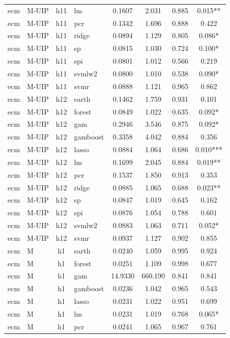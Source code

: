 \begin{ThreePartTable}
\begin{longtable}[t]{llclcccc}
ecm & M-UIP & h11 & lm & 0.1607 & 2.031 & 0.885 & 0.015**\\
ecm & M-UIP & h11 & pcr & 0.1342 & 1.696 & 0.888 & 0.422\\
ecm & M-UIP & h11 & ridge & 0.0894 & 1.129 & 0.805 & 0.086*\\
ecm & M-UIP & h11 & sp & 0.0815 & 1.030 & 0.724 & 0.100*\\
ecm & M-UIP & h11 & spi & 0.0801 & 1.012 & 0.566 & 0.219\\
ecm & M-UIP & h11 & svmlw2 & 0.0800 & 1.010 & 0.538 & 0.090*\\
ecm & M-UIP & h11 & svmr & 0.0888 & 1.121 & 0.965 & 0.862\\
\addlinespace
ecm & M-UIP & h12 & earth & 0.1462 & 1.759 & 0.931 & 0.101\\
ecm & M-UIP & h12 & forest & 0.0849 & 1.022 & 0.635 & 0.092*\\
ecm & M-UIP & h12 & gam & 0.2946 & 3.546 & 0.875 & 0.092*\\
ecm & M-UIP & h12 & gamboost & 0.3358 & 4.042 & 0.884 & 0.356\\
ecm & M-UIP & h12 & lasso & 0.0884 & 1.064 & 0.686 & 0.010***\\
ecm & M-UIP & h12 & lm & 0.1699 & 2.045 & 0.884 & 0.019**\\
ecm & M-UIP & h12 & pcr & 0.1537 & 1.850 & 0.913 & 0.353\\
ecm & M-UIP & h12 & ridge & 0.0885 & 1.065 & 0.688 & 0.023**\\
ecm & M-UIP & h12 & sp & 0.0847 & 1.019 & 0.645 & 0.162\\
ecm & M-UIP & h12 & spi & 0.0876 & 1.054 & 0.788 & 0.601\\
ecm & M-UIP & h12 & svmlw2 & 0.0883 & 1.063 & 0.711 & 0.052*\\
ecm & M-UIP & h12 & svmr & 0.0937 & 1.127 & 0.902 & 0.855\\
\addlinespace
ecm & M & h1 & earth & 0.0240 & 1.059 & 0.995 & 0.924\\
ecm & M & h1 & forest & 0.0251 & 1.109 & 0.998 & 0.677\\
ecm & M & h1 & gam & 14.9330 & 660.190 & 0.841 & 0.841\\
ecm & M & h1 & gamboost & 0.0236 & 1.042 & 0.965 & 0.543\\
ecm & M & h1 & lasso & 0.0231 & 1.022 & 0.951 & 0.699\\
ecm & M & h1 & lm & 0.0231 & 1.019 & 0.768 & 0.065*\\
ecm & M & h1 & pcr & 0.0241 & 1.065 & 0.967 & 0.761\\

\end{longtable}
\end{ThreePartTable}
